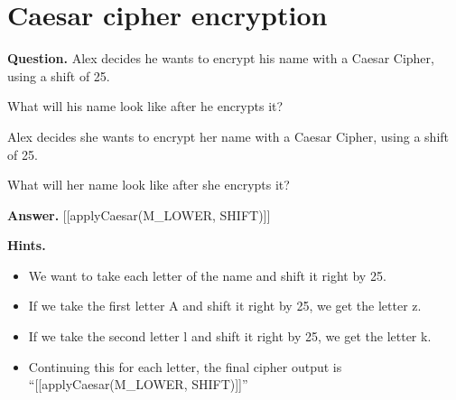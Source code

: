 \documentclass{article}
\begin{document}
\section*{Caesar cipher encryption}
\textbf{Question.} Alex decides he wants to encrypt his name with a Caesar Cipher,
                            using a shift of 25.
                        
                            What will his name look like after he encrypts it?
                        
                    
                        
                            Alex decides she wants to encrypt her name with a Caesar Cipher,
                            using a shift of 25.
                        
                            What will her name look like after she encrypts it?

\textbf{Answer.} [[applyCaesar(M\_LOWER, SHIFT)]]

\textbf{Hints.}
\begin{itemize}
  \item We want to take each letter of the name and shift it right by 25.
  \item If we take the first letter A and shift it right by 25, we get the letter
                z.
  \item If we take the second letter l and shift it right by 25, we get the letter
                k.
  \item Continuing this for each letter, the final cipher output is “[[applyCaesar(M\_LOWER, SHIFT)]]”
\end{itemize}
\end{document}
